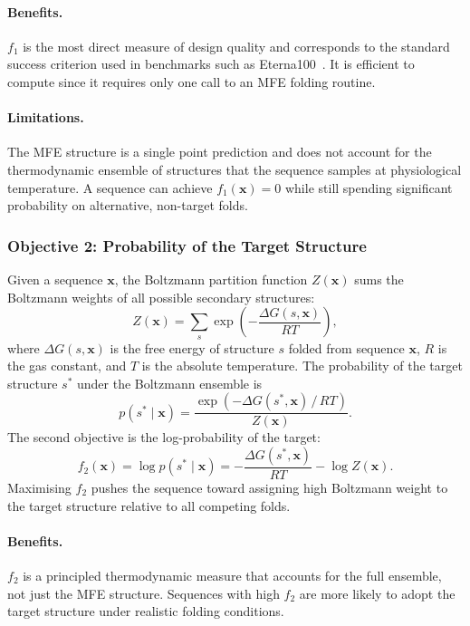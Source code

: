 \documentclass[11pt,a4paper]{article}
\begin{document}
\paragraph{Benefits.} $f_1$ is the most direct measure of design quality and
corresponds to the standard success criterion used in benchmarks such as
Eterna100~\cite{lee2014eterna}. It is efficient to compute since it requires
only one call to an MFE folding routine.

\paragraph{Limitations.} The MFE structure is a single point prediction and
does not account for the thermodynamic ensemble of structures that the
sequence samples at physiological temperature. A sequence can achieve
$f_1(\mathbf{x}) = 0$ while still spending significant probability on
alternative, non-target folds.

\subsubsection{Objective 2: Probability of the Target Structure}
\label{sec:obj2}

Given a sequence $\mathbf{x}$, the Boltzmann partition function $Z(\mathbf{x})$ sums
the Boltzmann weights of all possible secondary structures:
\[
  Z(\mathbf{x}) = \sum_{s} \exp\!\left(-\frac{\Delta G(s, \mathbf{x})}{RT}\right),
\]
where $\Delta G(s, \mathbf{x})$ is the free energy of structure $s$ folded
from sequence $\mathbf{x}$, $R$ is the gas constant, and $T$ is the absolute
temperature. The probability of the target structure $s^*$ under the
Boltzmann ensemble is
\[
  p(s^* \mid \mathbf{x}) = \frac{\exp\!\left(-\Delta G(s^*, \mathbf{x})\,/\,RT\right)}{Z(\mathbf{x})}.
\]
The second objective is the log-probability of the target:
\[
  f_2(\mathbf{x}) = \log p(s^* \mid \mathbf{x})
               = -\frac{\Delta G(s^*, \mathbf{x})}{RT} - \log Z(\mathbf{x}).
\]
Maximising $f_2$ pushes the sequence toward assigning high Boltzmann weight to
the target structure relative to all competing folds.

\paragraph{Benefits.} $f_2$ is a principled thermodynamic measure that
accounts for the full ensemble, not just the MFE structure. Sequences with
high $f_2$ are more likely to adopt the target structure under realistic
folding conditions.
\end{document}
